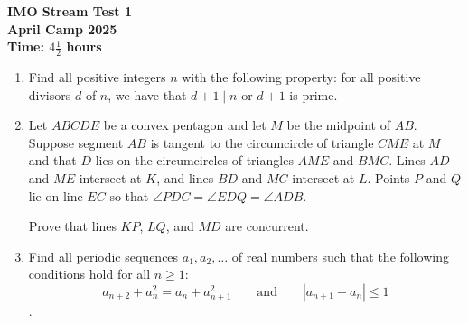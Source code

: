 \documentclass[14pt]{extarticle}
\begin{document}
\thispagestyle{empty}

\begin{center}
  \textbf{\Large IMO Stream Test 1}
  \\ \vspace{1em}
  \textbf{\large April Camp 2025}
  \\ \vspace{1em}
  \textbf{\large Time: $4\frac{1}{2}$ hours}
\end{center}


\begin{enumerate}[leftmargin=0pt,topsep=2\bigskipamount,itemsep=\medskipamount]

\item Find all positive integers $n$ with the following property: for all positive divisors $d$ of $n$, we have that $d+1\mid n$ or $d+1$ is prime.

\item Let $ABCDE$ be a convex pentagon and let $M$ be the midpoint of $AB$. Suppose segment $AB$ is tangent to the circumcircle of triangle $CME$ at $M$ and that $D$ lies on the circumcircles of triangles $AME$ and $BMC$. Lines $AD$ and $ME$ intersect at $K$, and lines $BD$ and $MC$ intersect at $L$. Points $P$ and $Q$ lie on line $EC$ so that $\angle PDC = \angle EDQ = \angle ADB$.

Prove that lines $KP$, $LQ$, and $MD$ are concurrent.

\item Find all periodic sequences $a_1, a_2, \dotsc$ of real numbers such that the following conditions hold for all $n\geqslant 1$:\[a_{n+2} + a_n^2=a_n+a_{n+1}^2\quad\quad\text{and}\quad\quad |a_{n+1}-a_n|\leqslant 1\].
\end{enumerate}
\end{document}
